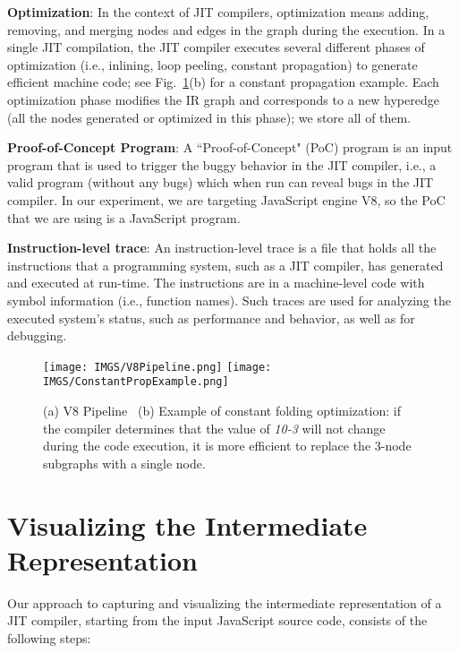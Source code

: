 \documentclass[runningheads]{llncs}
\begin{document}
\textbf{Optimization}: In the context of JIT compilers, optimization means adding, removing, and merging nodes and edges in the graph during the execution. In a single JIT compilation, the JIT compiler executes several different phases of optimization (i.e., inlining, loop peeling, constant propagation) to generate efficient machine code; see Fig.~\ref{fig:v8piepline_optexample}(b) for a constant propagation example. Each optimization phase modifies the IR graph and corresponds to a new hyperedge (all the nodes generated or optimized in this phase); we store all of them. 

\textbf{Proof-of-Concept Program}: A ``Proof-of-Concept" (PoC) program is an input program that is used to trigger the buggy behavior in the JIT compiler, i.e., a valid program (without any bugs) which when run can reveal bugs in the JIT compiler. In our experiment, we are targeting JavaScript engine V8, so the PoC that we are using is a JavaScript program.

\textbf{Instruction-level trace}: An instruction-level trace is a file that holds all the instructions that a programming system, such as a JIT compiler, has generated and executed at run-time. The instructions are in a machine-level code with symbol information (i.e., function names). Such traces are used for analyzing the executed system's status, such as performance and behavior, as well as for debugging. 

\begin{figure}[t]
    \begin{center}
    \texttt{[image: IMGS/V8Pipeline.png]}
    \texttt{[image: IMGS/ConstantPropExample.png]}
    \end{center}
    \caption{(a) V8 Pipeline~\cite{hinkelmann2017understanding} (b) Example of constant folding optimization: if the compiler determines that the value of \textit{10-3} will not change during the code execution, it is more efficient to replace the 3-node subgraphs with a single node.}
    \label{fig:v8piepline_optexample}
\end{figure}

\section{Visualizing the Intermediate Representation }\label{sec:research}

Our approach to capturing and visualizing the intermediate representation of a JIT compiler, starting from the input JavaScript source code, consists of the following steps:
\end{document}

